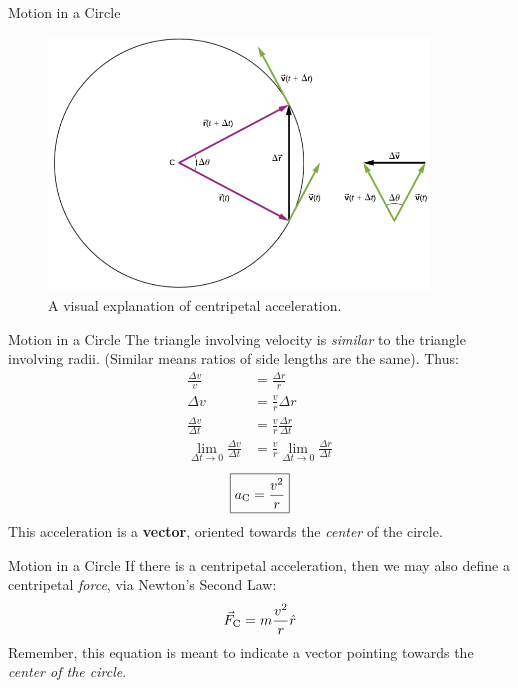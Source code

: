 \documentclass{beamer}
\begin{document}
\begin{frame}{Motion in a Circle}
\begin{figure}
\centering
\includegraphics[width=0.9\textwidth]{figures/circle.png}
\caption{\label{fig:circle} A visual explanation of centripetal acceleration.}
\end{figure}
\end{frame}

\begin{frame}{Motion in a Circle}
\small
The triangle involving velocity is \textit{similar} to the triangle involving radii.  (Similar means ratios of side lengths are the same).  Thus:
\begin{align}
\frac{\Delta v}{v} &= \frac{\Delta r}{r} \\
\Delta v &= \frac{v}{r}\Delta r \\
\frac{\Delta v}{\Delta t} &= \frac{v}{r}\frac{\Delta r}{\Delta t} \\
\lim_{\Delta t \to 0} \frac{\Delta v}{\Delta t} &= \frac{v}{r} \lim_{\Delta t \to 0} \frac{\Delta r}{\Delta t}
\end{align}
\begin{equation}
\boxed{a_{\rm C} = \frac{v^2}{r}}
\end{equation}
This acceleration is a \textbf{vector}, oriented towards the \textit{center} of the circle.
\end{frame}

\begin{frame}{Motion in a Circle}
If there is a centripetal acceleration, then we may also define a centripetal \textit{force}, via Newton's Second Law:
\begin{equation}
\vec{F}_{\rm C} = m \frac{v^2}{r} \hat{r}
\end{equation}
Remember, this equation is meant to indicate a vector pointing towards the \textit{center of the circle}.
\end{frame}
\end{document}
